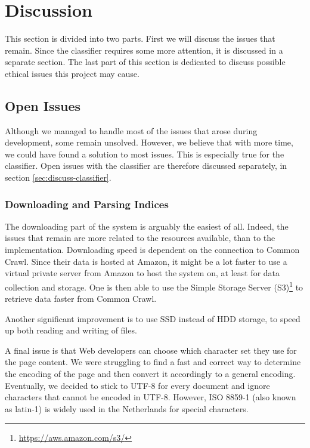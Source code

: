 \chapter{Discussion}\label{sec:discussion}

This section is divided into two parts. First we will discuss the issues that remain. Since the classifier requires some more attention, it is discussed in a separate section. The last part of this section is dedicated to discuss possible ethical issues this project may cause.

\section{Open Issues}\label{sec:Discussion - Open Issues}
Although we managed to handle most of the issues that arose during development, some remain unsolved. However, we believe that with more time, we could have found a solution to most issues. This is especially true for the classifier. Open issues with the classifier are therefore discussed separately, in section \ref{sec:discuss-classifier}.

\subsection{Downloading and Parsing Indices}
The downloading part of the system is arguably the easiest of all. Indeed, the issues that remain are more related to the resources available, than to the implementation. Downloading speed is dependent on the connection to Common Crawl. Since their data is hosted at Amazon, it might be a lot faster to use a virtual private server from Amazon to host the system on, at least for data collection and storage. One is then able to use the Simple Storage Server (S3)\footnote{\url{https://aws.amazon.com/s3/}} to retrieve data faster from Common Crawl.

Another significant improvement is to use SSD instead of HDD storage, to speed up both reading and writing of files.

A final issue is that Web developers can choose which character set they use for the page content. We were struggling to find a fast and correct way to determine the encoding of the page and then convert it accordingly to a general encoding. Eventually, we decided to stick to UTF-8 for every document and ignore characters that cannot be encoded in UTF-8. However, ISO 8859-1 (also known as latin-1) is widely used in the Netherlands for special characters.

